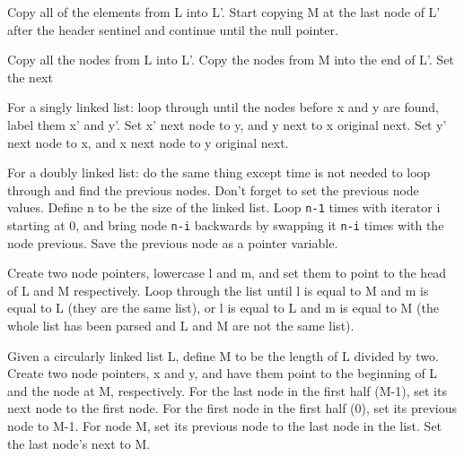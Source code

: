 Copy all of the elements from L into L'.  Start copying M at the last node of L' after the header sentinel and continue until the null pointer.

Copy all the nodes from L into L'.  Copy the nodes from M into the end of L'.  Set the next 

For a singly linked list: loop through until the nodes before x and y are found, label them x' and y'.  Set x' next node to y, and y next to x original next.  Set y' next node to x, and x next node to y original next.

For a doubly linked list: do the same thing except time is not needed to loop through and find the previous nodes.  Don't forget to set the previous node values.
Define n to be the size of the linked list.  Loop \texttt{n-1} times with iterator i starting at 0, and bring node \texttt{n-i} backwards by swapping it \texttt{n-i} times with the node previous.  Save the previous node as a pointer variable.


Create two node pointers, lowercase l and m, and set them to point to the head of L and M respectively.  Loop through the list until l is equal to M and m is equal to L (they are the same list), or l is equal to L and m is equal to M (the whole list has been parsed and L and M are not the same list).


Given a circularly linked list L, define M to be the length of L divided by two.
Create two node pointers, x and y, and have them point to the beginning of L and the node at M, respectively.  For the last node in the first half (M-1), set its next node to the first node.  For the first node in the first half (0), set its previous node to M-1.  For node M, set its previous node to the last node in the list.  Set the last node's next to M.